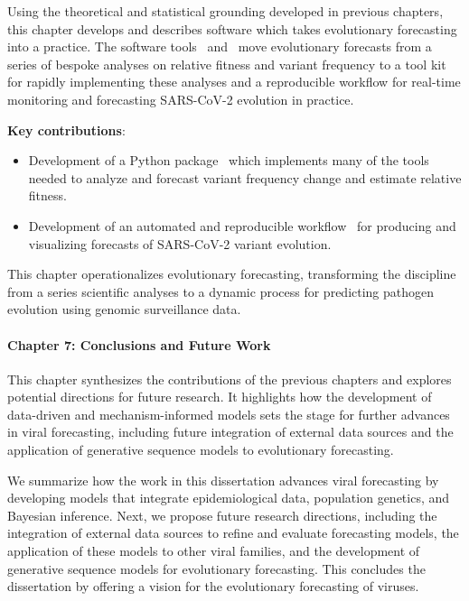 Using the theoretical and statistical grounding developed in previous chapters, this chapter develops and describes software which takes evolutionary forecasting into a practice.
The software tools \evofr\ and \forecastsNcov\ move evolutionary forecasts from a series of bespoke analyses on relative fitness and variant frequency to a tool kit for rapidly implementing these analyses and a reproducible workflow for real-time monitoring and forecasting SARS-CoV-2 evolution in practice.

\noindent\textbf{Key contributions}:
\begin{itemize}
  \item Development of a Python package \evofr\ which implements many of the tools needed to analyze and forecast variant frequency change and estimate relative fitness.
  \item Development of an automated and reproducible workflow \forecastsNcov\ for producing and visualizing forecasts of SARS-CoV-2 variant evolution.
\end{itemize}

This chapter operationalizes evolutionary forecasting, transforming the discipline from a series scientific analyses to a dynamic process for predicting pathogen evolution using genomic surveillance data.

\paragraph{Chapter 7: Conclusions and Future Work}

This chapter synthesizes the contributions of the previous chapters and explores potential directions for future research.
It highlights how the development of data-driven and mechanism-informed models sets the stage for further advances in viral forecasting, including future integration of external data sources and the application of generative sequence models to evolutionary forecasting.

We summarize how the work in this dissertation advances viral forecasting by developing models that integrate epidemiological data, population genetics, and Bayesian inference.
Next, we propose future research directions, including the integration of external data sources to refine and evaluate forecasting models, the application of these models to other viral families, and the development of generative sequence models for evolutionary forecasting.
This concludes the dissertation by offering a vision for the evolutionary forecasting of viruses.

